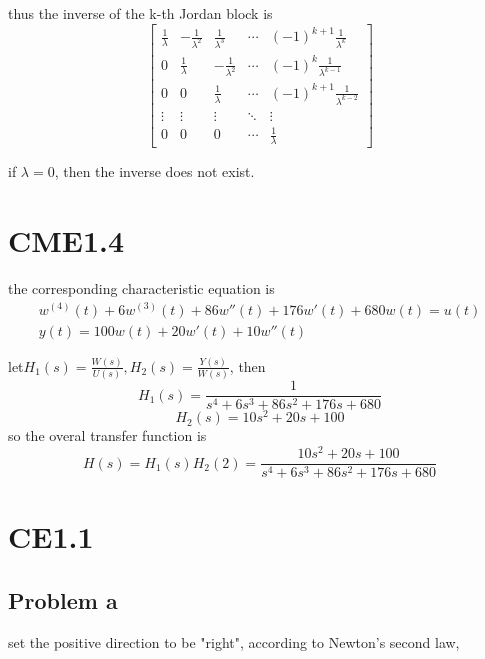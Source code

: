 \documentclass[12pt,a4paper]{article}
\begin{document}
thus the inverse of the k-th Jordan block is
\[
    \begin{bmatrix}
        \frac{1}{\lambda} &- \frac{1}{\lambda^2} & \frac{1}{\lambda^3} & \cdots & (-1)^{k+1} \frac{1}{\lambda^{k}} \\
        0                 & \frac{1}{\lambda}     & -\frac{1}{\lambda^2} & \cdots & (-1)^{k} \frac{1}{\lambda^{k-1}} \\
        0                 & 0                     & \frac{1}{\lambda}     & \cdots & (-1)^{k+1} \frac{1}{\lambda^{k-2}} \\
        \vdots            & \vdots                & \vdots                & \ddots & \vdots \\
        0                 & 0                     & 0                     & \cdots & \frac{1}{\lambda}
    \end{bmatrix}
\]

if $\lambda = 0$, then the inverse does not exist.

\section{CME1.4}
the corresponding characteristic equation is
\[
\begin{aligned}
    w^{(4)}(t) + 6w^{(3)}(t) + 86w''(t) + 176w'(t) + 680w(t) = u(t) \\
    y(t) = 100w(t) + 20w'(t)+10w''(t)
\end{aligned}
\]

let$H_1(s)=\frac{W(s)}{U(s)}, H_2(s) = \frac{Y(s)}{W(s)}$,
then 
\[
    H_1(s) = \frac{1}{s^4+6s^3+86s^2+176s+680}
\]
\[ 
    H_2(s) = 10s^2+20s+100
\]
so the overal transfer function is
\[
    H(s) = H_1(s)H_2(2)= \frac{10s^2+20s+100}{s^4+6s^3+86s^2+176s+680}
\]

\section{CE1.1}
\subsection{Problem a}
set the positive direction to be "right",
according to Newton's second law,
\end{document}

